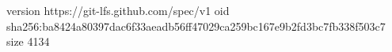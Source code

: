 version https://git-lfs.github.com/spec/v1
oid sha256:ba8424a80397dac6f33aeadb56ff47029ca259bc167e9b2fd3bc7fb338f503c7
size 4134
